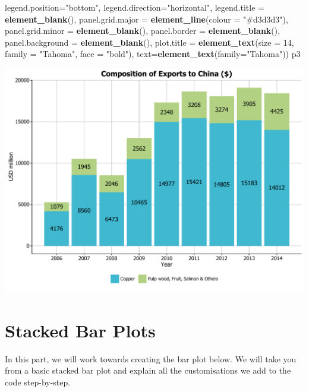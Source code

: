 \documentclass[]{article}
\newenvironment{Shaded}{\begin{snugshade}}{\end{snugshade}}
\newcommand{\KeywordTok}[1]{\textcolor[rgb]{0.13,0.29,0.53}{\textbf{{#1}}}}
\newcommand{\DataTypeTok}[1]{\textcolor[rgb]{0.13,0.29,0.53}{{#1}}}
\newcommand{\DecValTok}[1]{\textcolor[rgb]{0.00,0.00,0.81}{{#1}}}
\newcommand{\StringTok}[1]{\textcolor[rgb]{0.31,0.60,0.02}{{#1}}}
\newcommand{\NormalTok}[1]{{#1}}
\begin{document}
\begin{Shaded}
\begin{Highlighting}[]
        \DataTypeTok{legend.position=}\StringTok{"bottom"}\NormalTok{, }\DataTypeTok{legend.direction=}\StringTok{"horizontal"}\NormalTok{, }
        \DataTypeTok{legend.title =} \KeywordTok{element_blank}\NormalTok{(),}
        \DataTypeTok{panel.grid.major =} \KeywordTok{element_line}\NormalTok{(}\DataTypeTok{colour =} \StringTok{"#d3d3d3"}\NormalTok{), }
        \DataTypeTok{panel.grid.minor =} \KeywordTok{element_blank}\NormalTok{(), }
        \DataTypeTok{panel.border =} \KeywordTok{element_blank}\NormalTok{(), }
        \DataTypeTok{panel.background =} \KeywordTok{element_blank}\NormalTok{(),}
        \DataTypeTok{plot.title =} \KeywordTok{element_text}\NormalTok{(}\DataTypeTok{size =} \DecValTok{14}\NormalTok{, }\DataTypeTok{family =} \StringTok{"Tahoma"}\NormalTok{, }\DataTypeTok{face =} \StringTok{"bold"}\NormalTok{), }
        \DataTypeTok{text=}\KeywordTok{element_text}\NormalTok{(}\DataTypeTok{family=}\StringTok{"Tahoma"}\NormalTok{))  }
\NormalTok{p3}
\end{Highlighting}
\end{Shaded}

\begin{center}\includegraphics{0_all_posts_pdf/bar_13-1} \end{center}

\section{Stacked Bar Plots}\label{stacked-bar-plots}

In this part, we will work towards creating the bar plot below. We will
take you from a basic stacked bar plot and explain all the
customisations we add to the code step-by-step.
\end{document}
